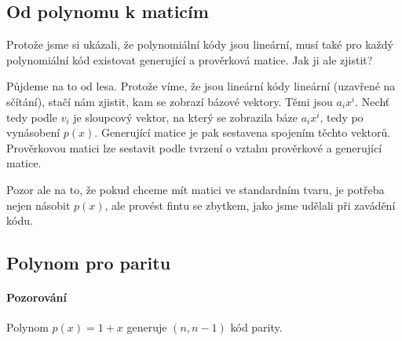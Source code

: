 \documentclass[a4paper,12pt]{article}
\begin{document}
\subsection{Od polynomu k maticím}
Protože jsme si ukázali, že polynomiální kódy jsou lineární, musí také pro každý 
polynomiální kód existovat generující a prověrková matice. Jak ji ale zjistit?

Půjdeme na to od lesa. Protože víme, že jsou lineární kódy lineární (uzavřené na 
sčítání), stačí nám zjistit, kam se zobrazí bázové vektory. Těmi jsou $a_ix^i$.  
Nechť tedy podle $v_i$ je sloupcový vektor, na který se zobrazila báze $a_ix^i$, 
tedy po vynásobení $p(x)$. Generující matice je pak sestavena spojením těchto 
vektorů. Prověrkovou matici lze sestavit podle tvrzení o vztahu prověrkové a 
generující matice.

Pozor ale na to, že pokud chceme mít matici ve standardním tvaru, je potřeba 
nejen násobit $p(x)$, ale provést fintu se zbytkem, jako jsme udělali při 
zavádění kódu.

\subsection{Polynom pro paritu}
\paragraph{Pozorování}
Polynom $p(x) = 1 + x$ generuje $(n, n-1)$ kód parity.
\end{document}
